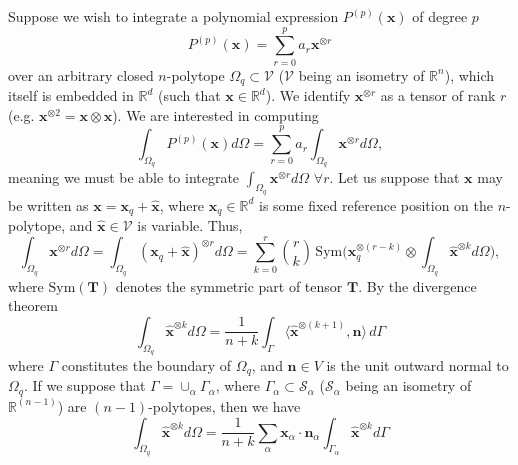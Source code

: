 \documentclass[11pt]{article} %
\begin{document}
Suppose we wish to integrate a polynomial expression $P^{(p)}(\mathbf{x})$ of degree $p$
\begin{equation}
	P^{(p)}(\mathbf{x}) = \sum_{r=0}^{p} a_r \mathbf{x}^{\otimes r}
\end{equation}
over an arbitrary closed $n$-polytope $\Omega_q \subset \mathcal{V}$ ($\mathcal{V}$ being an isometry of $\mathbb{R}^n$), which itself is embedded in $\mathbb{R}^d$ (such that $\mathbf{x} \in \mathbb{R}^d$). We identify $\mathbf{x}^{\otimes r}$ as a tensor of rank $r$ (e.g. $\mathbf{x}^{\otimes 2} = \mathbf{x} \otimes \mathbf{x}$). We are interested in computing
\begin{equation}
	\int_{\Omega_q} P^{(p)}(\mathbf{x}) d \Omega = \sum_{r=0}^{p} a_r \int_{\Omega_q} \mathbf{x}^{\otimes r} d \Omega,
\end{equation}
meaning we must be able to integrate $\int_{\Omega_q} \mathbf{x}^{\otimes r} d \Omega \, \, \forall r$. Let us suppose that $\mathbf{x}$ may be written as $\mathbf{x} = \mathbf{x}_q + \hat{\mathbf{x}}$, where $\mathbf{x}_q \in \mathbb{R}^d$ is some fixed reference position on the $n$-polytope, and $\hat{\mathbf{x}} \in \mathcal{V}$ is variable. Thus,
\begin{equation}
	\int_{\Omega_q} \mathbf{x}^{\otimes r} d \Omega = \int_{\Omega_q} (\mathbf{x}_q + \hat{\mathbf{x}})^{\otimes r} d \Omega = \sum_{k = 0}^r \binom{r}{k} \, \mbox{Sym}
\bigg( \mathbf{x}_q^{\otimes (r-k)} \otimes \int_{\Omega_q} \hat{\mathbf{x}}^{\otimes k} d \Omega \bigg) ,
\end{equation}
where $\mbox{Sym} ( \mathbf{T} )$ denotes the symmetric part of tensor $\mathbf{T}$. By the divergence theorem
\begin{equation}
	\int_{\Omega_q} \hat{\mathbf{x}}^{\otimes k} d \Omega = \frac{1}{n+k} \int_{\Gamma} \langle \hat{\mathbf{x}}^{\otimes (k+1)} , \mathbf{n} \rangle \, d \Gamma
\end{equation}
where $\Gamma$ constitutes the boundary of $\Omega_q$, and $\mathbf{n} \in V$ is the unit outward normal to $\Omega_q$. If we suppose that $\Gamma = \cup_{\alpha} \Gamma_{\alpha}$, where $\Gamma_{\alpha} \subset \mathcal{S}_{\alpha}$ ($\mathcal{S}_\alpha$ being an isometry of $\mathbb{R}^{(n-1)}$) are $(n-1)$-polytopes, then we have
\begin{equation}
	\int_{\Omega_q} \hat{\mathbf{x}}^{\otimes k} d \Omega = \frac{1}{n+k} \sum_{\alpha} \mathbf{x}_{\alpha} \cdot \mathbf{n}_{\alpha} \int_{\Gamma_{\alpha}} \hat{\mathbf{x}}^{\otimes k}   d \Gamma
\end{equation}
\end{document}
